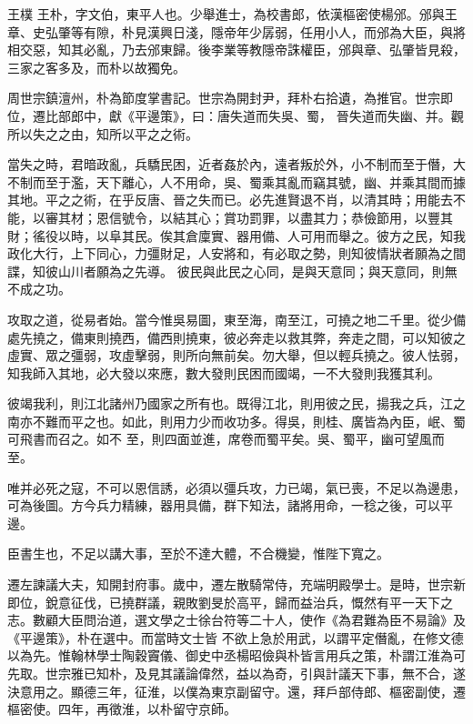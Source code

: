 
\begin{pinyinscope}

 王樸
 王朴，字文伯，東平人也。少舉進士，為校書郎，依漢樞密使楊邠。邠與王章、史弘肇等有隙，朴見漢興日淺，隱帝年少孱弱，任用小人，而邠為大臣，與將相交惡，知其必亂，乃去邠東歸。後李業等教隱帝誅權臣，邠與章、弘肇皆見殺，三家之客多及，而朴以故獨免。



 周世宗鎮澶州，朴為節度掌書記。世宗為開封尹，拜朴右拾遺，為推官。世宗即位，遷比部郎中，獻《平邊策》，曰：唐失道而失吳、蜀，
 晉失道而失幽、并。觀所以失之之由，知所以平之之術。



 當失之時，君暗政亂，兵驕民困，近者姦於內，遠者叛於外，小不制而至于僭，大不制而至于濫，天下離心，人不用命，吳、蜀乘其亂而竊其號，幽、并乘其間而據其地。平之之術，在乎反唐、晉之失而已。必先進賢退不肖，以清其時；用能去不能，以審其材；恩信號令，以結其心；賞功罰罪，以盡其力；恭儉節用，以豐其財；徭役以時，以阜其民。俟其倉廩實、器用備、人可用而舉之。彼方之民，知我政化大行，上下同心，力彊財足，人安將和，有必取之勢，則知彼情狀者願為之間諜，知彼山川者願為之先導。
 彼民與此民之心同，是與天意同；與天意同，則無不成之功。



 攻取之道，從易者始。當今惟吳易圖，東至海，南至江，可撓之地二千里。從少備處先撓之，備東則撓西，備西則撓東，彼必奔走以救其弊，奔走之間，可以知彼之虛實、眾之彊弱，攻虛擊弱，則所向無前矣。勿大舉，但以輕兵撓之。彼人怯弱，知我師入其地，必大發以來應，數大發則民困而國竭，一不大發則我獲其利。



 彼竭我利，則江北諸州乃國家之所有也。既得江北，則用彼之民，揚我之兵，江之南亦不難而平之也。如此，則用力少而收功多。得吳，則桂、廣皆為內臣，岷、蜀可飛書而召之。如不
 至，則四面並進，席卷而蜀平矣。吳、蜀平，幽可望風而至。



 唯并必死之寇，不可以恩信誘，必須以彊兵攻，力已竭，氣已喪，不足以為邊患，可為後圖。方今兵力精練，器用具備，群下知法，諸將用命，一稔之後，可以平邊。



 臣書生也，不足以講大事，至於不達大體，不合機變，惟陛下寬之。



 遷左諫議大夫，知開封府事。歲中，遷左散騎常侍，充端明殿學士。是時，世宗新即位，銳意征伐，已撓群議，親敗劉旻於高平，歸而益治兵，慨然有平一天下之志。數顧大臣問治道，選文學之士徐台符等二十人，使作《為君難為臣不易論》及《平邊策》，朴在選中。而當時文士皆
 不欲上急於用武，以謂平定僭亂，在修文德以為先。惟翰林學士陶穀竇儀、御史中丞楊昭儉與朴皆言用兵之策，朴謂江淮為可先取。世宗雅已知朴，及見其議論偉然，益以為奇，引與計議天下事，無不合，遂決意用之。顯德三年，征淮，以僕為東京副留守。還，拜戶部侍郎、樞密副使，遷樞密使。四年，再徵淮，以朴留守京師。




\end{pinyinscope}
